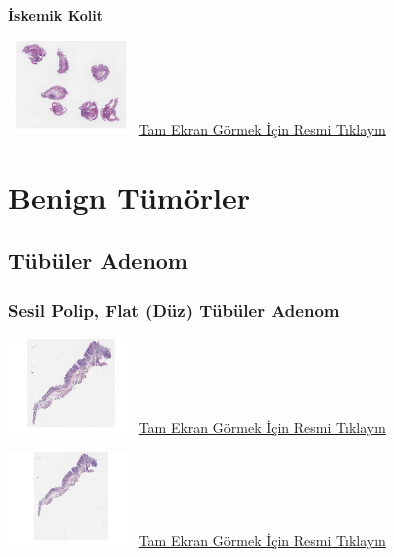 \documentclass[
  letterpaper,
  DIV=11,
  numbers=noendperiod]{scrreprt}
\begin{document}
\textbf{İskemik Kolit}

\href{https://images.patolojiatlasi.com/ischemic-colitis/HE.html}{\includegraphics[width=0.25\textwidth,height=\textheight]{./screenshots/thumbnail_ischemic-colitis.png}}
\href{https://images.patolojiatlasi.com/ischemic-colitis/HE.html}{Tam
Ekran Görmek İçin Resmi Tıklayın}

\hypertarget{sec-kolon-benign-tumorler}{%
\section{Benign Tümörler}\label{sec-kolon-benign-tumorler}}

\hypertarget{sec-kolon-tubuler-adenom}{%
\subsection{Tübüler Adenom}\label{sec-kolon-tubuler-adenom}}

\hypertarget{sec-kolon-sesil-polip}{%
\subsubsection{Sesil Polip, Flat (Düz) Tübüler
Adenom}\label{sec-kolon-sesil-polip}}

\href{https://images.patolojiatlasi.com/tubularadenoma-flat/HE.html}{\includegraphics[width=0.25\textwidth,height=\textheight]{./screenshots/thumbnail_tubularadenoma-flat1.png}}
\href{https://images.patolojiatlasi.com/tubularadenoma-flat/HE.html}{Tam
Ekran Görmek İçin Resmi Tıklayın}

\href{https://images.patolojiatlasi.com/tubularadenoma-flat/HE2.html}{\includegraphics[width=0.25\textwidth,height=\textheight]{./screenshots/thumbnail_tubularadenoma-flat2.png}}
\href{https://images.patolojiatlasi.com/tubularadenoma-flat/HE2.html}{Tam
Ekran Görmek İçin Resmi Tıklayın}
\end{document}
